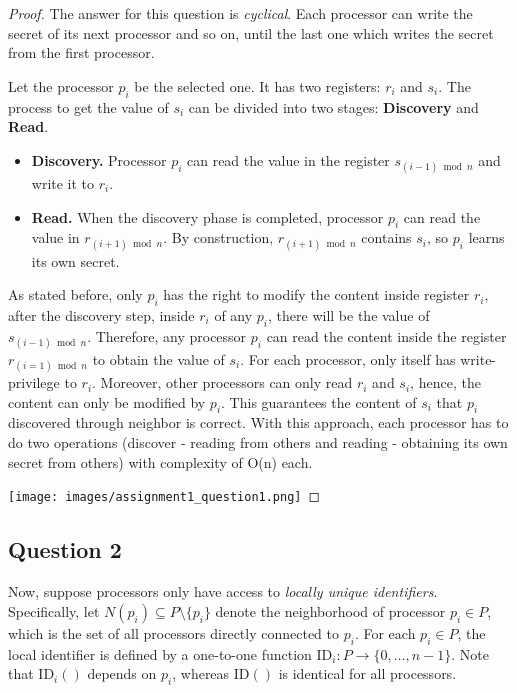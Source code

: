 \documentclass[12pt]{article}
\begin{document}
\begin{proof}

The answer for this question is \emph{cyclical}. 
Each processor can write the secret of its next processor and so on, 
until the last one which writes the secret from the first processor.

Let the processor $p_i$ be the selected one. 
It has two registers: $r_i$ and $s_i$. 
The process to get the value of $s_i$ can be divided into two stages: 
\textbf{Discovery} and \textbf{Read}.

\begin{itemize}
    \item \textbf{Discovery.}  
    Processor $p_i$ can read the value in the register $s_{(i-1)\bmod n}$ 
    and write it to $r_i$.
    
    \item \textbf{Read.}  
    When the discovery phase is completed, 
    processor $p_i$ can read the value in $r_{(i+1)\bmod n}$.  
    By construction, $r_{(i+1)\bmod n}$ contains $s_i$, 
    so $p_i$ learns its own secret.
\end{itemize}

As stated before, only \(p_i\) has the right to modify the content inside register \(r_i\),
after the discovery step, inside \(r_i\) of any \(p_i\), there will be the value of \(s_{(i-1)\bmod n}\).
Therefore, any processor \(p_i\) can read the content inside the register \(r_{(i=1)\bmod n}\) to obtain the value of \(s_i\).
For each processor, only itself has write-privilege to \(r_i\). Moreover, other processors can only read \(r_i\) and \(s_i\), hence,
the content can only be modified by \(p_i\). This guarantees the content of \(s_i\) that \(p_i\) discovered through neighbor is correct.
With this approach, each processor has to do two operations (discover - reading from others and reading - obtaining its own secret from others) with complexity of O(n) each.

\texttt{[image: images/assignment1\_question1.png]}



\end{proof}

\vspace{2in} %


\subsection*{Question 2}
Now, suppose processors only have access to \emph{locally unique identifiers}.
Specifically, let $N(p_i) \subseteq P \setminus \{p_i\}$ denote the neighborhood of processor 
$p_i \in P$, which is the set of all processors directly connected to $p_i$.
For each $p_i \in P$, the local identifier is defined by a one-to-one function 
$\mathrm{ID}_i: P \to \{0, \ldots, n-1\}$. 
Note that $\mathrm{ID}_i()$ depends on $p_i$, whereas $\mathrm{ID}()$ is identical for all processors. 
\end{document}

